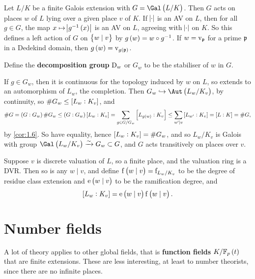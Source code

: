 
Let $ L / K $ be a finite Galois extension with $ G = \Gal\br{L / K} $. Then $ G $ acts on places $ w $ of $ L $ lying over a given place $ v $ of $ K $. If $ \abs{\cdot} $ is an AV on $ L $, then for all $ g \in G $, the map $ x \mapsto \abs{g^{-1}\br{x}} $ is an AV on $ L $, agreeing with $ \abs{\cdot} $ on $ K $. So this defines a left action of $ G $ on $ \cbr{w \mid v} $ by $ g\br{w} = w \circ g^{-1} $. If $ w = \mathrm{v}_{\mathfrak{p}} $ for a prime $ \mathfrak{p} $ in a Dedekind domain, then $ g\br{w} = \v_{g\br{\ppp}} $.

\begin{definition*}
Define the \textbf{decomposition group} $ \mathrm{D}_w $ or $ G_w $ to be the stabiliser of $ w $ in $ G $.
\end{definition*}

If $ g \in G_w $, then it is continuous for the topology induced by $ w $ on $ L $, so extends to an automorphism of $ L_w $, the completion. Then $ G_w \hookrightarrow \Aut\br{L_w / K_v} $, by continuity, so $ \#G_w \le \sbr{L_w : K_v} $, and
$$ \#G = \br{G : G_w}\#G_w \le \br{G : G_w}\sbr{L_w : K_v} = \sum_{g \in G / G_w} \sbr{L_{g\br{w}} : K_v} \le \sum_{w' \mid v} \sbr{L_{w'} : K_v} = \sbr{L : K} = \#G, $$
by \ref{cor:1.6}. So have equality, hence $ \sbr{L_w : K_v} = \#G_w $, and so $ L_w / K_v $ is Galois with group $ \Gal\br{L_w / K_v} \xrightarrow{\sim} G_w \subset G $, and $ G $ acts transitively on places over $ v $.

\begin{notation*}
Suppose $ v $ is discrete valuation of $ L $, so a finite place, and the valuation ring is a DVR. Then so is any $ w \mid v $, and define $ \f\br{w \mid v} = \f_{L_w / K_v} $ to be the degree of residue class extension and $ \e\br{w \mid v} $ to be the ramification degree, and
$$ \sbr{L_w : K_v} = \e\br{w \mid v}\f\br{w \mid v}. $$
\end{notation*}

\pagebreak

\section{Number fields}

\begin{remark*}
A lot of theory applies to other global fields, that is \textbf{function fields} $ K / \FF_p\br{t} $ that are finite extensions. These are less interesting, at least to number theorists, since there are no infinite places.
\end{remark*}

